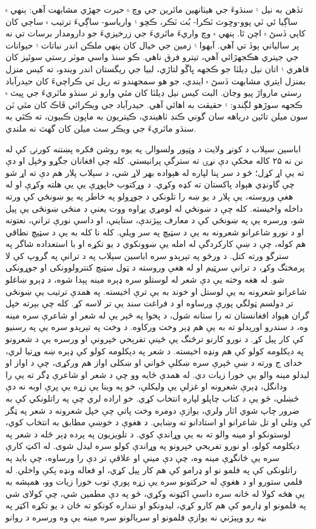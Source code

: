 \documentclass[a4paper]{article}
\begin{document}
تڏهن به نيل ۽ سنڌوءَ جي هيٺانهين ماٿرين جي وچ ۾ حيرت جهڙي مشابهت آهي: ٻنهي ۾ ساڳيا ئي ٽي پوو-وڇوٽ ٽڪرا- بُٺ ٽڪر، ڪچو ۽ وارياسو- ساڳيءَ ترتيب ۾ ساڄي کان کاٻي ڏسڻ ۾ اچن ٿا. ٻنهي ۾ وچ واريءَ ماٿريءَ جي زرخيزيءَ جو دارومدار برسات تي نه پر سالياني ٻوڏ تي آهي. آبهوا ۽ زمين جي خيال کان ٻنهي ملڪن اندر نباتات ۽ حيوانات جي جيتري هڪجهڙائي آهي، تيترو فرق ناهي. ڪو سنڌ واسي موٽر رستي سوئيز کان قاهري ۽ اتان نيل ڊيلٽا جو ڪجهه ڀاڱو لتاڙي، لبيا جي ريگستان اندر ويندو، ته کيس منزل بمنزل ايتري مشابهت ڏسڻ ۾ ايندي، جو هو سمجهندو ته ريل تي ڪراچيءَ کان حيدرآباد رستي مارواڙ پيو وڃان. البت کيس نيل ڊيلٽا کان مٿي وارو تر سنڌو ماٿريءَ جي ڀيٽ ۾ ڪجهه سوڙهو لڳندو: ۽ حقيقت به اهائي آهي. حيدرآباد جي ويڪرائي ڦاڪ کان مٿي ٽن سون ميلن تائين درياهه سان گوني ڪنڊ ٺاهيندي، ڪيتريون به ماپون ڪبيون، ته ڪٿي به سنڌو ماٿريءَ جي ويڪر سٺ ميلن کان گهٽ نه ملندي.

اباسین سېلاب د کونړ ولایت د وټپور ولسوالۍ په یوه روشن فکره پښتنه کورنۍ کې له نن نه ۲۵ کاله مخکې دې نړۍ ته سترگې پرانیستي. کله چې افغانان جگړو وڅپل او دې ته یې اړ کړل؛ څو د سر پنا لپاره له هېواده بهر لاړ شي، د سېلاب پلار هم دې ته اړ شو چې گاونډي هېواد پاکستان ته کډه وکړي. د وړکتوب خاپوړې یې یې هلته وکړې او له هغې وروسته، یې پلار د یو ښه را تلونکي د جوړولو په خاطر په یو ښونځي کې ورته داخله واخیسته. کله چې د ښونځي له لومړي پړاوه ووت یعنې د منځی ښونځی یې پیل شو، ورسره یې په ښونځي کې د معارف پېژندې، ستاینې، او داسې نورې ترانې، نعتونه او د نورو شاعرانو شعرونه به یې د سټیچ په سر ویلې. کله نا کله به یې د سټیچ نطاقي هم کوله، چې د ښې کارکردگې له امله یې ښوونکوي د یو تکړه او با استعداده شاگر په سترگو ورته کتل. د ورځو په تېرېدو سره اباسین سېلاب په د ترانې په گروپ کې لا پرمختگ وکړ، د ترانې سرټیم او له هغې وروسته د ټول سټیچ کنترولوونکی او جوړونکی شو. له هغه وخته یې دې شعر له لوستلو سره ډېره مینه پېدا شوه، د ډېرو ښاغلو شاعرانو شعرونه به یې لوستل او خوند به یې ترې اخیسته. په همدې ترتیب یې ښونځی تر دولسم ټولگي پورې ورساوه او د فراغت سند یې تر لاسه کړ. کله چې بېرته خپل گران هېواد افغانستان ته را ستانه شول، د پخوا په څېر یې له شعر او شاعرې سره مینه وه، د سندرو اورېدلو ته به یې هم ډېر وخت ورکاوه. د وخت په تېرېدو سره یې په رسنیو کې کار پیل کړ. د نورو کارنو ترڅنگ یې ځینې تفرېحي خپرونې او ورسره یې د شعرونو په دیکلومه کولو کې هم ونډه اخیسته. د شعر په دېکلومه کولو کې ډېره ښه وړتیا لري، خدای ج ورته د ښې څېرې سره ښکلې ځواني او ښکلی اواز هم ورکړی، چې د اواز او لیدلو مینه والو یې خورا زیات دي. له همدې ځایه وو چې د شعر او شاعرې ډگر ته یې را ودانگل، ډېرې شعرونه او غزلې یې ولیکلې، خو په وینا یې زړه یې پرې اوبه نه دې څښلي، څو یې د کتاب چاپلو لپاره انتخاب کړي. خو اراده لري چې په راتلونکي کې به ضرور چاپ شوي اثار ولري، یوازې دومره وخت پاتې چې خپل شعرونه د شعر په ټگر کې وتلي او تل شاعرانو او استادانو ته وښایي. د هغوې د خوښې مطابق به انتخاب کوي، لوستونکو او مینه والو ته به یې وړاندې کوي. د تلویزیون په پرده ډېر ځله د شعر په دیکلومه کولو، او نورو تفریحي خپرونو په وړاندې کولو سره لیدل شوی. له اکټ کارې سره یې ځانگړې مینه وه، چې دې مینې او علاقې تر دې را ورساوه، چې باید په راتلونکی کې په فلمو نو او ډرامو کې هم کار پیل کړي، او فعاله ونډه پکې واخلي. له فلمي ستورو او د هغوې له حرکتونو سره یې زړه پورې توب خورا زیات وو، همېشه به یې هڅه کولا له ځانه سره داسې اکټونه وکړي، څو په دې مطمین شي، چې کولای شي په فلمونو او ډارمو کې هم کارو کړي، لیدونکو او ننداره کونکو ته ځان د یو تکړه اکټر په بڼه رو وپېژني نه یوازې فلمونو او سریالونو سره مینه یې وه ورسره د روانو 
\end{document}
